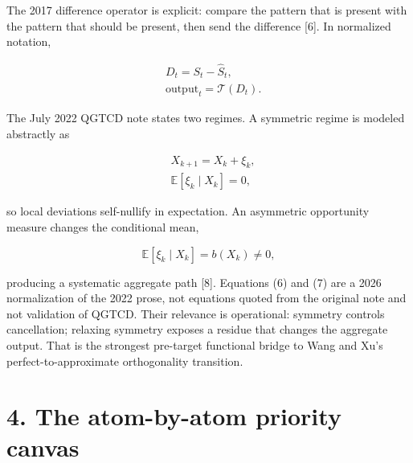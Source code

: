 \documentclass[
  american,
  11pt,
  letterpaper,
]{article}
\begin{document}
The 2017 difference operator is explicit: compare the pattern that is present with the pattern that should be present, then send the difference {[}6{]}. In normalized notation,

\begin{equation}
\begin{aligned}
& D_t=S_t-\widehat{S}_t, \\
& \text{output}_t=\mathcal{T}(D_t).
\end{aligned}
\tag{5}
\end{equation}

The July 2022 QGTCD note states two regimes. A symmetric regime is modeled abstractly as

\begin{equation}
\begin{aligned}
& X_{k+1}=X_k+\xi_k, \\
& \mathbb{E}[\xi_k\mid X_k]=0,
\end{aligned}
\tag{6}
\end{equation}

so local deviations self-nullify in expectation. An asymmetric opportunity measure changes the conditional mean,

\begin{equation}
\mathbb{E}[\xi_k\mid X_k]=b(X_k)\ne0,
\tag{7}
\end{equation}

producing a systematic aggregate path {[}8{]}. Equations (6) and (7) are a 2026 normalization of the 2022 prose, not equations quoted from the original note and not validation of QGTCD. Their relevance is operational: symmetry controls cancellation; relaxing symmetry exposes a residue that changes the aggregate output. That is the strongest pre-target functional bridge to Wang and Xu's perfect-to-approximate orthogonality transition.

\section{4. The atom-by-atom priority canvas}\label{the-atom-by-atom-priority-canvas}
\end{document}
